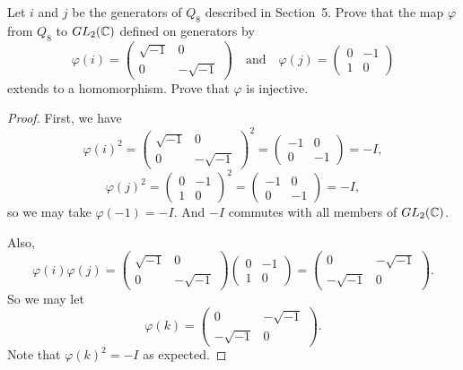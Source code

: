  Let $i$ and $j$ be the generators of $Q_8$ described in
Section~5. Prove that the map $\varphi$ from $Q_8$ to $GL_2(\mathbb{C})$
defined on generators by
\begin{equation*}
  \varphi(i) =
  \begin{pmatrix}
    \sqrt{-1} & 0 \\
    0 & -\sqrt{-1}
  \end{pmatrix}
  \quad\text{and}\quad
  \varphi(j) =
  \begin{pmatrix}
    0 & -1 \\
    1 & 0
  \end{pmatrix}
\end{equation*}
extends to a homomorphism. Prove that $\varphi$ is injective.
\begin{proof}
  First, we have
  \begin{equation*}
    \varphi(i)^2 =
    \begin{pmatrix}
      \sqrt{-1} & 0 \\
      0 & -\sqrt{-1}
    \end{pmatrix}^2 =
    \begin{pmatrix}
      -1 & 0 \\
      0 & -1
    \end{pmatrix} = -I,
  \end{equation*}
  \begin{equation*}
    \varphi(j)^2 =
    \begin{pmatrix}
      0 & -1 \\
      1 & 0
    \end{pmatrix}^2 =
    \begin{pmatrix}
      -1 & 0 \\
      0 & -1
    \end{pmatrix} = -I,
  \end{equation*}
  so we may take $\varphi(-1) = -I$. And $-I$ commutes with all
  members of $GL_2(\mathbb{C})$.

  Also,
  \begin{equation*}
    \varphi(i)\varphi(j) =
    \begin{pmatrix}
      \sqrt{-1} & 0 \\
      0 & -\sqrt{-1}
    \end{pmatrix}
    \begin{pmatrix}
      0 & -1 \\
      1 & 0
    \end{pmatrix} =
    \begin{pmatrix}
      0 & -\sqrt{-1} \\
      -\sqrt{-1} & 0
    \end{pmatrix}.
  \end{equation*}
  So we may let
  \begin{equation*}
    \varphi(k) =
    \begin{pmatrix}
      0 & -\sqrt{-1} \\
      -\sqrt{-1} & 0
    \end{pmatrix}.
  \end{equation*}
  Note that $\varphi(k)^2 = -I$ as expected.


\end{proof}
